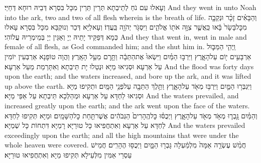 {וְעָאלוּ עִם נֹחַ לְתֵיבְתָא תְּרֵין תְּרֵין מִכָּל בִּסְרָא דְּבֵיהּ רוּחָא דְּחַיֵּי׃}
{And they went in unto Noah into the ark, two and two of all flesh wherein is the breath of life.}{}
{וְהַבָּאִ֗ים זָכָ֨ר וּנְקֵבָ֤ה מִכׇּל\maqqaf בָּשָׂר֙ בָּ֔אוּ כַּֽאֲשֶׁ֛ר צִוָּ֥ה אֹת֖וֹ אֱלֹהִ֑ים וַיִּסְגֹּ֥ר יְהֹוָ֖ה בַּֽעֲדֽוֹ׃}
{וְעָאלַיָּא דְּכַר וְנוּקְבָּא מִכָּל בִּסְרָא עָאלוּ כְּמָא דְּפַקֵּיד יָתֵיהּ יְיָ וְאַגֵּין יְיָ בְּמֵימְרֵיהּ עֲלוֹהִי׃}
{And they that went in, went in male and female of all flesh, as God commanded him; and the \lord\space shut him in.}{}
{וַֽיְהִ֧י הַמַּבּ֛וּל אַרְבָּעִ֥ים י֖וֹם עַל\maqqaf הָאָ֑רֶץ וַיִּרְבּ֣וּ הַמַּ֗יִם וַיִּשְׂאוּ֙ אֶת\maqqaf הַתֵּבָ֔ה וַתָּ֖רׇם מֵעַ֥ל הָאָֽרֶץ׃}
{וַהֲוָה טוֹפָנָא אַרְבְּעִין יוֹמִין עַל אַרְעָא וּסְגִיאוּ מַיָּא וּנְטַלוּ יָת תֵּיבְתָא וְאִתָּרַמַת מֵעַל אַרְעָא׃}
{And the flood was forty days upon the earth; and the waters increased, and bore up the ark, and it was lifted up above the earth.}{}
{וַיִּגְבְּר֥וּ הַמַּ֛יִם וַיִּרְבּ֥וּ מְאֹ֖ד עַל\maqqaf הָאָ֑רֶץ וַתֵּ֥לֶךְ הַתֵּבָ֖ה עַל\maqqaf פְּנֵ֥י הַמָּֽיִם׃}
{וּתְקִיפוּ מַיָּא וּסְגִיאוּ לַחְדָּא עַל אַרְעָא וּמְהַלְּכָא תֵּיבְתָא עַל אַפֵּי מַיָּא׃}
{And the waters prevailed, and increased greatly upon the earth; and the ark went upon the face of the waters.}{}
{וְהַמַּ֗יִם גָּ֥בְר֛וּ מְאֹ֥ד מְאֹ֖ד עַל\maqqaf הָאָ֑רֶץ וַיְכֻסּ֗וּ כׇּל\maqqaf הֶֽהָרִים֙ הַגְּבֹהִ֔ים אֲשֶׁר\maqqaf תַּ֖חַת כׇּל\maqqaf הַשָּׁמָֽיִם׃}
{וּמַיָּא תְּקִיפוּ לַחְדָּא לַחְדָּא עַל אַרְעָא וְאִתְחֲפִיאוּ כָּל טוּרַיָּא רָמַיָּא דִּתְחוֹת כָּל שְׁמַיָּא׃}
{And the waters prevailed exceedingly upon the earth; and all the high mountains that were under the whole heaven were covered.}{}
{חֲמֵ֨שׁ עֶשְׂרֵ֤ה אַמָּה֙ מִלְמַ֔עְלָה גָּבְר֖וּ הַמָּ֑יִם וַיְכֻסּ֖וּ הֶהָרִֽים׃}
{חֲמֵישׁ עַסְרֵי אַמִּין מִלְּעֵילָא תְּקִיפוּ מַיָּא וְאִתְחֲפִיאוּ טוּרַיָּא׃}
